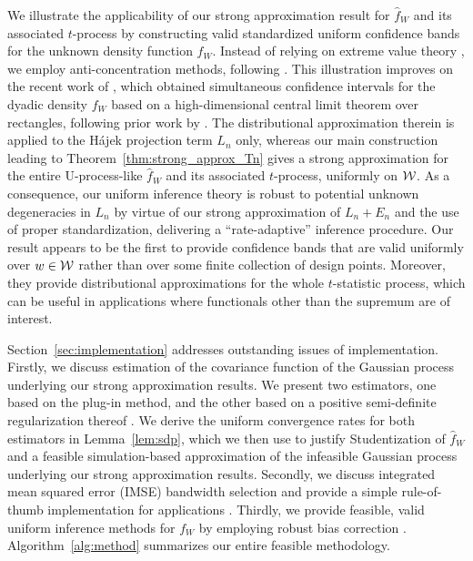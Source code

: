 We illustrate the applicability of our strong approximation result for
$\hat{f}_W$ and its associated $t$-process by constructing valid
standardized uniform confidence bands for
the unknown density function $f_W$.
Instead of relying on extreme value theory \citep*[e.g.][]{gine2004kernel}, we
employ anti-concentration methods, following \citet{chernozhukov2014anti}.
This illustration improves on the recent work of \citet{chiang2022inference},
which obtained simultaneous confidence intervals for the dyadic density $f_W$
based on a high-dimensional central limit theorem over rectangles,
following prior work by \citet{Chernozhukov-Chetverikov-Kato_2017_AoP}.
The distributional
approximation therein is applied to the
H\'{a}jek projection term $L_n$ only, whereas
our main construction leading to Theorem~\ref{thm:strong_approx_Tn} gives a
strong approximation for the entire U-process-like
$\hat{f}_W$ and its associated $t$-process, uniformly on $\mathcal{W}$.
As a consequence, our uniform inference theory is robust to potential
unknown degeneracies in $L_n$ by virtue of our strong
approximation of $L_n+E_n$ and the use of proper standardization,
delivering a ``rate-adaptive'' inference procedure.
Our result appears to be the first to provide
confidence bands that are valid uniformly
over $w \in \mathcal{W}$ rather than over some finite collection of design points.
Moreover, they provide distributional approximations for
the whole $t$-statistic process,
which can be useful in applications where functionals other
than the supremum are of interest.

Section~\ref{sec:implementation} addresses outstanding issues of
implementation. Firstly, we discuss estimation of the covariance function of the
Gaussian process underlying our strong approximation results. We present two
estimators, one based on the plug-in method, and the other based on a
positive semi-definite regularization thereof
\citep{laurent2005semidefinite}. We derive the uniform convergence rates for
both estimators in Lemma~\ref{lem:sdp}, which we then use to justify
Studentization of $\hat{f}_W$ and a
feasible simulation-based approximation of the infeasible Gaussian process
underlying our strong approximation results.
Secondly, we discuss integrated mean
squared error (IMSE) bandwidth selection and provide a simple rule-of-thumb
implementation for applications \citep{wand1994kernel,simonoff2012smoothing}.
Thirdly, we provide
feasible, valid uniform inference methods for
$f_W$ by employing robust bias correction
\citep{Calonico-Cattaneo-Farrell_2018_JASA,
Calonico-Cattaneo-Farrell_2022_Bernoulli}.
Algorithm~\ref{alg:method} summarizes our entire feasible methodology.

